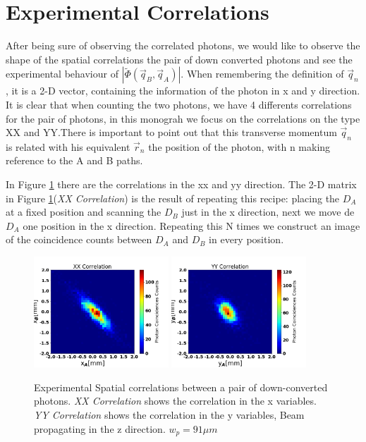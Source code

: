 \section{Experimental Correlations }

After being sure of observing the correlated photons, we would like to observe the shape of the spatial correlations the pair of down converted
photons and see the experimental behaviour of $|\tilde{\Phi}(\vec{q}_B,\vec{q}_A)|$.
When remembering the definition of $\vec{q}_n$, it is a 2-D vector, containing the information
of the photon in x and y direction. It is clear that when counting the two photons, we have 
4 differents correlations for the pair of photons, in this monograh we focus on the correlations on the type XX and YY.There
is important to point out that this transverse momentum $\vec{q}_n$ is related with
his equivalent $\vec{r}_n$ the position of the photon, with n making reference to the A and B paths.





In Figure \ref{fig:expCorrelations} there are the correlations in the xx and yy  direction.
The 2-D matrix in Figure \ref{fig:expCorrelations}(\textit{XX Correlation}) is
 the result of repeating this recipe: placing the $D_A$ at a fixed position and scanning the $D_B$ just in the 
x direction, next we move de $D_A$ one position in the x direction. Repeating this N times 
we construct an image of the coincidence counts between $D_A$ and $D_B$ in every position.

\begin{figure}[h!]
\centering
{  \includegraphics[width=0.45\textwidth]{Figures/xxCorrelation.png} }
{  \includegraphics[width=0.45\textwidth]{Figures/yyCorrelation.png} }
\caption{Experimental Spatial correlations between a pair of down-converted photons. \textit{XX Correlation} shows the correlation in the x variables. \textit{YY Correlation} shows the correlation in the y variables, Beam propagating in the z direction. $w_p = 91\mu m$}
 \label{fig:expCorrelations}
\end{figure}

